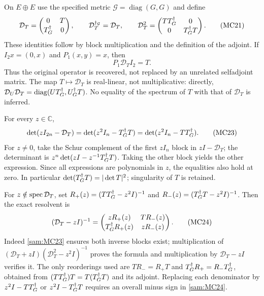 On \(E\oplus E\) use the specified metric
\(\mathcal G=\operatorname{diag}(G,G)\) and define
\begin{equation}
 \mathcal D_T=
 \begin{pmatrix}0&T\\T^\dagger_G&0\end{pmatrix},
 \qquad
 \mathcal D_T^{\dagger_{\mathcal G}}=\mathcal D_T,\qquad
 \mathcal D_T^2=
 \begin{pmatrix}TT^\dagger_G&0\\0&T^\dagger_G T\end{pmatrix}.
 \tag{MC21}\label{sam:MC21}
\end{equation}
These identities follow by block multiplication and the definition of
the adjoint. If \(I_2x=(0,x)\) and \(P_1(x,y)=x\), then
\begin{equation}
 P_1\mathcal D_T I_2=T.
 \tag{MC22}\label{sam:MC22}
\end{equation}
Thus the original operator is recovered, not replaced by an unrelated
selfadjoint matrix. The map \(T\mapsto\mathcal D_T\) is real-linear,
not multiplicative: directly,
\(\mathcal D_U\mathcal D_T=\operatorname{diag}(UT^\dagger_G,U^\dagger_G T)\).
No equality of the spectrum of \(T\) with that of \(\mathcal D_T\)
is inferred.

For every \(z\in\mathbb C\),
\begin{equation}
 \det(zI_{2n}-\mathcal D_T)
  =\det(z^2I_n-T^\dagger_G T)
  =\det(z^2I_n-TT^\dagger_G).
 \tag{MC23}\label{sam:MC23}
\end{equation}
For \(z\ne0\), take the Schur complement of the first \(zI_n\)
block in \(zI-\mathcal D_T\); the determinant is
\(z^n\det(zI-z^{-1}T^\dagger_G T)\). Taking the other block yields
the other expression. Since all expressions are polynomials in \(z\),
the equalities also hold at zero. In particular
\(\det(T^\dagger_G T)=|\det T|^2\); singularity of \(T\) is retained.

For \(z\notin\operatorname{spec}\mathcal D_T\), set
\(R_+(z)=(TT^\dagger_G-z^2I)^{-1}\) and
\(R_-(z)=(T^\dagger_G T-z^2I)^{-1}\). Then the exact resolvent is
\begin{equation}
 (\mathcal D_T-zI)^{-1}
 =\begin{pmatrix}
 zR_+(z)&T R_-(z)\\
 T^\dagger_G R_+(z)&zR_-(z)
 \end{pmatrix}.
 \tag{MC24}\label{sam:MC24}
\end{equation}
Indeed \eqref{sam:MC23} ensures both inverse blocks exist; multiplication
of \((\mathcal D_T+zI)(\mathcal D_T^2-z^2I)^{-1}\) proves the
formula and multiplication by \(\mathcal D_T-zI\) verifies it.
The only reorderings used are \(TR_-=R_+T\) and
\(T^\dagger_G R_+=R_-T^\dagger_G\), obtained from
\((TT^\dagger_G)T=T(T^\dagger_G T)\) and its adjoint.
Replacing each denominator by \(z^2I-TT^\dagger_G\) or
\(z^2I-T^\dagger_G T\) requires an overall minus sign in \eqref{sam:MC24}.

